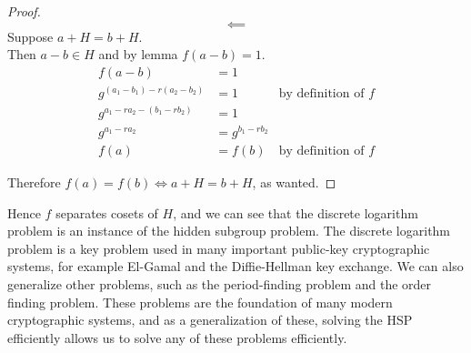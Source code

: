 \documentclass{beamer}
\begin{document}
\begin{frame}
\begin{proof}
                        $$\impliedby$$
                Suppose $a + H = b + H$.\\
                Then $a - b \in H$ and by lemma $f(a - b) = 1$.
                \begin{align*}
                        f(a - b) &= 1\\
                        g^{(a_1 - b_1) - r(a_2 - b_2)} &= 1 & \text{by definition of $f$}\\
                        g^{a_1 - ra_2 - (b_1 - rb_2)} &= 1\\
                        g^{a_1 - ra_2} &= g^{b_1 - r b_2}\\
                        f(a) &= f(b) & \text{by definition of $f$}
                \end{align*}
                
                Therefore $f(a) = f(b) \iff a + H = b + H$, as wanted.
        \end{proof}
        Hence $f$ separates cosets of $H$, and we can see that the discrete logarithm problem is an instance of the hidden subgroup problem.
        The discrete logarithm problem is a key problem used in many important public-key cryptographic systems, for example El-Gamal and the Diffie-Hellman key exchange.
        We can also generalize other problems, such as the period-finding problem and the order finding problem.
        These problems are the foundation of many modern cryptographic systems, and as a generalization of these, solving the HSP efficiently allows us to solve any of these problems efficiently.
\end{frame}
\end{document}
